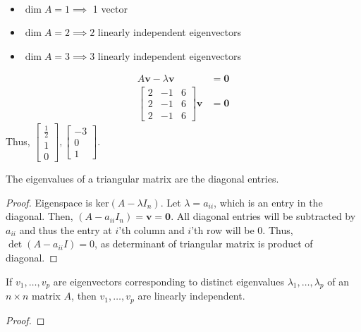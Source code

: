 \documentclass[11pt]{scrartcl}
\theoremstyle{dotlessP}
\theoremstyle{dotlessN}
\newcommand{\mb}[1]{\mathbf{#1}}
\newcommand{\kernel}{\text{ker}}
\begin{document}
	\begin{soln} \
		\begin{itemize}
			\item $\dim A = 1 \implies$ 1 vector
			\item $\dim A = 2 \implies 2$ linearly independent eigenvectors
			\item $\dim A = 3 \implies 3$ linearly independent eigenvectors
		\end{itemize}
		\begin{align*}
			A\bm{v} - \lambda \bm{v} &= \bm{0} \\
			\begin{bmatrix}
				2 & -1 & 6 \\
				2 & -1 & 6 \\
				2 & -1 & 6
			\end{bmatrix} \bm{v} &= \bm{0}
		\end{align*}
		Thus,  $
\begin{bmatrix}
	\frac{1}{2} \\
	1 \\
	0
\end{bmatrix},
\begin{bmatrix}
	-3 \\
	0 \\
	1
\end{bmatrix}
		$.
	\end{soln}
	\begin{theorem}
		The eigenvalues of a triangular matrix are the diagonal entries.
	\end{theorem}
	\begin{proof}
		Eigenspace is $\kernel (A - \lambda I_n)$. Let $\lambda = a_{ii}$, which is an entry in the diagonal. Then, $(A - a_{ii}I_n) = \mb{v} = \bm{0}$. All diagonal entries will be subtracted by $a_{ii}$ and thus the entry at $i$'th column and $i$'th row will be 0. Thus, $\det (A - a_{ii}I) = 0$, as determinant of triangular matrix is product of diagonal.
	\end{proof}
	\begin{theorem}
		If $v_1, \dots, v_p$ are eigenvectors corresponding to distinct eigenvalues $\lambda_1, \dots, \lambda_p$ of an $n \times n$ matrix $A$, then $v_1, \dots, v_p$ are linearly independent.
	\end{theorem}
	\begin{proof}
			
	\end{proof}
\end{document}
